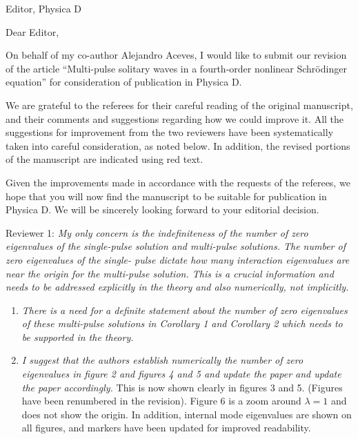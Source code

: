 \documentclass[11pt]{letter}
\begin{document}
\address{Ross Parker \\
Department of Mathematics \\
Southern Methodist University \\
Dallas, TX 75275 \\
\texttt{rhparker@smu.edu}}%
\signature{Ross Parker}
\begin{letter}{Editor, Physica D}

\opening{Dear Editor,}

On behalf of my co-author Alejandro Aceves, I would like to submit our revision of the article ``Multi-pulse solitary waves in a fourth-order nonlinear {S}chr{\"o}dinger equation'' for consideration of publication in Physica D. 

We are grateful to the referees for their careful reading of the original manuscript, and their comments and suggestions regarding how we could improve it. All the suggestions for improvement from the two reviewers have been systematically taken into careful consideration, as noted below. In addition, the revised portions of the manuscript are indicated using red text.

Given the improvements made in accordance with the requests of the referees, we hope that you will now find the manuscript to be suitable for publication in Physica D. We will be sincerely looking forward to your editorial decision.

Reviewer 1: \emph{My only concern is the indefiniteness of the number of zero eigenvalues of the single-pulse solution and multi-pulse solutions. The number of zero eigenvalues of the single- pulse dictate how many interaction eigenvalues are near the origin for the multi-pulse solution. This is a crucial information and needs to be addressed explicitly in the theory and also numerically, not implicitly.}

\begin{enumerate}
\item \emph{There is a need for a definite statement about the number of zero eigenvalues of these multi-pulse solutions in Corollary 1 and Corollary 2 which needs to be supported in the theory.}
\vspace{4mm}

\item \emph{I suggest that the authors establish numerically the number of zero eigenvalues in figure 2 and figures 4 and 5 and update the paper and update the paper accordingly.}
\vspace{4mm} This is now shown clearly in figures 3 and 5. (Figures have been renumbered in the revision). Figure 6 is a zoom around $\lambda = 1$ and does not show the origin. In addition, internal mode eigenvalues are shown on all figures, and markers have been updated for improved readability.


\end{enumerate}
\end{letter}
\end{document}
